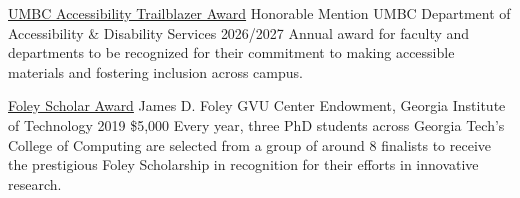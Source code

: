 \begin{cventries}
\cvaward
{\href{https://my3.my.umbc.edu/groups/accessibility/posts/159513}{UMBC Accessibility Trailblazer Award} Honorable Mention}
{UMBC Department of Accessibility \& Disability Services}
{2026/2027}
{}
{Annual award for faculty and departments to be recognized for their commitment to making accessible materials and fostering inclusion across campus.}



\cvaward
{\href{https://research.gatech.edu/ipat/foley-endowment}{Foley Scholar Award}}%
{James D. Foley GVU Center Endowment, Georgia Institute of Technology}%
{2019}
{\$5,000}
{Every year, three PhD students across Georgia Tech's College of Computing are selected from a group of around 8 finalists to receive the prestigious Foley Scholarship in recognition for their efforts in innovative research.}






\end{cventries}